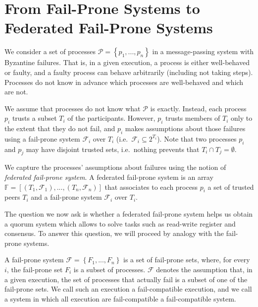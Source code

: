 \documentclass[11pt,letterpaper]{article}
\begin{document}
\appendix

\section{From Fail-Prone Systems to Federated Fail-Prone Systems}


We consider a set of processes $\mathcal{P}=\left\{p_1,...,p_n\right\}$ in a message-passing system with Byzantine failures.
That is, in a given execution, a process is either well-behaved or faulty, and a faulty process can behave arbitrarily (including not taking steps).
Processes do not know in advance which processes are well-behaved and which are not.

We assume that processes do not know what $\mathcal{P}$ is exactly.
Instead, each process $p_i$ trusts a subset $T_i$ of the participants.
However, $p_i$ trusts members of $T_i$ only to the extent that they do not fail, and $p_i$ makes assumptions about those failures using a fail-prone system $\mathcal{F}_i$ over $T_i$ (i.e.\ $\mathcal{F}_i\subseteq 2^{T_i}$).
Note that two processes $p_i$ and $p_j$ may have disjoint trusted sets, i.e.\ nothing prevents that $T_i\cap T_j=\emptyset$.

We capture the processes' assumptions about failures using the notion of \emph{federated fail-prone system}. A federated fail-prone system is an array $\mathbb{F}=\left[\left(T_1,\mathcal{F}_1\right),...,\left(T_n,\mathcal{F}_n\right)\right]$ that associates to each process $p_i$ a set of trusted peers $T_i$ and a fail-prone system $\mathcal{F}_i$ over $T_i$.

The question we now ask is whether a federated fail-prone system helps us obtain a quorum system which allows to solve tasks such as read-write register and consensus.
To answer this question, we will proceed by analogy with the fail-prone systems.

A fail-prone system $\mathcal{F}=\left\{F_1,...,F_n\right\}$ is a set of fail-prone sets, where, for every $i$, the fail-prone set $F_i$ is a subset of processes.
$\mathcal{F}$ denotes the assumption that, in a given execution, the set of processes that actually fail is a subset of one of the fail-prone sets.
We call such an execution a fail-compatible execution, and we call a system in which all execution are fail-compatible a fail-compatible system.
\end{document}
